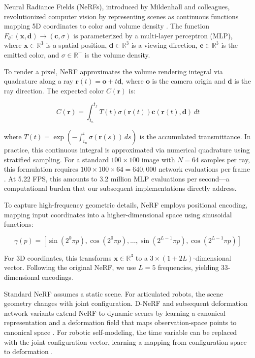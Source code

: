 \documentclass[12pt,a4paper,oneside]{report}
\begin{document}
Neural Radiance Fields (NeRFs), introduced by Mildenhall and colleagues, revolutionized computer vision by representing scenes as continuous functions mapping 5D coordinates to color and volume density \cite{mildenhall2020nerf}. The function $F_\theta: (\mathbf{x}, \mathbf{d}) \rightarrow (\mathbf{c}, \sigma)$ is parameterized by a multi-layer perceptron (MLP), where $\mathbf{x} \in \mathbb{R}^3$ is a spatial position, $\mathbf{d} \in \mathbb{R}^3$ is a viewing direction, $\mathbf{c} \in \mathbb{R}^3$ is the emitted color, and $\sigma \in \mathbb{R}^+$ is the volume density.

To render a pixel, NeRF approximates the volume rendering integral via quadrature along a ray $\mathbf{r}(t) = \mathbf{o} + t\mathbf{d}$, where $\mathbf{o}$ is the camera origin and $\mathbf{d}$ is the ray direction. The expected color $C(\mathbf{r})$ is:

\begin{equation}
C(\mathbf{r}) = \int_{t_n}^{t_f} T(t) \sigma(\mathbf{r}(t)) \mathbf{c}(\mathbf{r}(t), \mathbf{d}) \, dt
\end{equation}

where $T(t) = \exp\left(-\int_{t_n}^{t} \sigma(\mathbf{r}(s)) \, ds\right)$ is the accumulated transmittance. In practice, this continuous integral is approximated via numerical quadrature using stratified sampling. For a standard $100 \times 100$ image with $N = 64$ samples per ray, this formulation requires $100 \times 100 \times 64 = 640,000$ network evaluations per frame \cite{mildenhall2020nerf}. At 5.22 FPS, this amounts to 3.2 million MLP evaluations per second—a computational burden that our subsequent implementations directly address.

To capture high-frequency geometric details, NeRF employs positional encoding, mapping input coordinates into a higher-dimensional space using sinusoidal functions:

\begin{equation}
\gamma(p) = [\sin(2^0 \pi p), \cos(2^0 \pi p), \ldots, \sin(2^{L-1} \pi p), \cos(2^{L-1} \pi p)]
\end{equation}

For 3D coordinates, this transforms $\mathbf{x} \in \mathbb{R}^3$ to a $3 \times (1 + 2L)$-dimensional vector. Following the original NeRF, we use $L = 5$ frequencies, yielding 33-dimensional encodings.

Standard NeRF assumes a static scene. For articulated robots, the scene geometry changes with joint configuration. D-NeRF and subsequent deformation network variants extend NeRF to dynamic scenes by learning a canonical representation and a deformation field that maps observation-space points to canonical space \cite{pumarola2021d, park2021nerfies}. For robotic self-modeling, the time variable can be replaced with the joint configuration vector, learning a mapping from configuration space to deformation \cite{hu2024teaching}.
\end{document}
